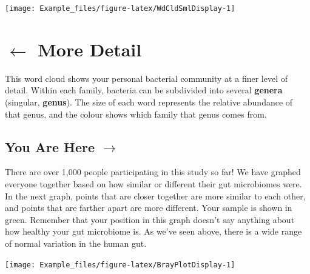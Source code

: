 \documentclass[
]{article}
\begin{document}
\begin{multicols}{2}
\raggedcolumns

\begin{center}\texttt{[image: Example\_files/figure-latex/WdCldSmlDisplay-1]} \end{center}

\columnbreak

\vspace*{1cm}
\section{$\boldsymbol{\leftarrow}$ More Detail}
\begin{small}
This word cloud shows your personal bacterial community at a finer 
level of detail. Within each family, bacteria can be subdivided into 
several \textbf{genera} (singular, \textbf{genus}). The size of each word
represents the relative abundance of that genus, and the colour shows
which family that genus comes from.
\end{small}
\vspace*{\fill}

\end{multicols}

\begin{multicols}{2}
\raggedcolumns

\vspace*{\fill}
\section{You Are Here $\boldsymbol{\rightarrow}$}
\begin{small}
There are over 1,000 people participating in this study so far! We have 
graphed everyone together based on how similar or different their gut
microbiomes were. In the next graph, points that are closer together
are more similar to each other, and points that are farther apart are
more different. Your sample is shown in green. Remember that your 
position in this graph doesn't say anything about how healthy your
gut microbiome is. As we've seen above, there is a wide range of 
normal variation in the human gut.
\end{small}

\vspace*{\fill}
\columnbreak

\vspace*{1cm}

\begin{center}\texttt{[image: Example\_files/figure-latex/BrayPlotDisplay-1]} \end{center}

\vspace*{\fill}

\end{multicols}
\end{document}
